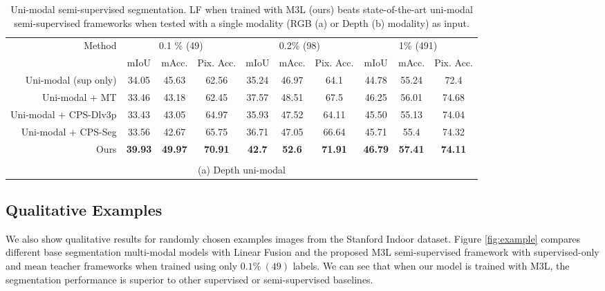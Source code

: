\documentclass[10pt,twocolumn,letterpaper]{article}
\makeatletter
\newcommand\footnoteref[1]{\protected@xdef\@thefnmark{\ref{#1}}\@footnotemark}
\makeatother
\begin{document}
\begin{table*}[]
{\begin{tabular}{rccccccccc}
\toprule
\multirow{2}{*}{Method} & \multicolumn{3}{c}{0.1 \% (49)} & \multicolumn{3}{c}{0.2\% (98)} & \multicolumn{3}{c}{1\% (491)} \\
 & mIoU & mAcc. & \multicolumn{1}{c|}{Pix. Acc.} & mIoU & mAcc. & \multicolumn{1}{c|}{Pix. Acc.} & mIoU & mAcc. & Pix. Acc. \\ \midrule
Uni-modal (sup only) & 34.05 & 45.63 & \multicolumn{1}{c|}{62.56} & 35.24 & 46.97 & \multicolumn{1}{c|}{64.1} & 44.78 & 55.24 & 72.4 \\
Uni-modal + MT \cite{mt} & 33.46 & 43.18 & \multicolumn{1}{c|}{62.45} & 37.57 & 48.51 & \multicolumn{1}{c|}{67.5} & 46.25 & 56.01 & 74.68 \\
Uni-modal + CPS-Dlv3p \cite{chen2021-CPS} & 33.43 & 43.05 & \multicolumn{1}{c|}{64.97} & 35.93 & 47.52	&\multicolumn{1}{c|}{64.11} & 45.50 & 55.13 & 74.04 \\
Uni-modal + CPS-Seg\footnoteref{note:cps-seg} \cite{chen2021-CPS}& 33.56 & 42.67 & \multicolumn{1}{c|}{65.75} & 36.71 & 47.05 & \multicolumn{1}{c|}{66.64} & 45.71 & 55.4 & 74.32 \\ \midrule
Ours & \textbf{39.93} & \textbf{49.97} & \multicolumn{1}{c|}{\textbf{70.91}} & \textbf{42.7} & \textbf{52.6} & \multicolumn{1}{c|}{\textbf{71.91}} & \textbf{46.79} & \textbf{57.41} & \textbf{74.11} \\ \bottomrule


\multicolumn{10}{c}{\vspace{0.1cm}}\\
\multicolumn{10}{c}{(a) Depth uni-modal}\\

\end{tabular}
}
\caption{Uni-modal semi-supervised segmentation. LF when trained with M3L (ours) beats state-of-the-art uni-modal semi-supervised frameworks when tested with a single modality (RGB (a) or Depth (b) modality) as input.}
\label{tab:uni-modal}
\end{table*}  \subsection{Qualitative Examples}
We also show qualitative results for randomly chosen examples images from the Stanford Indoor \cite{stanfordindoor} dataset. 
Figure \ref{fig:example} compares different base segmentation multi-modal models with Linear Fusion and the proposed M3L semi-supervised framework with supervised-only and mean teacher \cite{mt} frameworks when trained using only $0.1\% ~(49)$ labels. 
We can see that when our model is trained with M3L, the segmentation performance is superior to other supervised or semi-supervised baselines.
\end{document}

